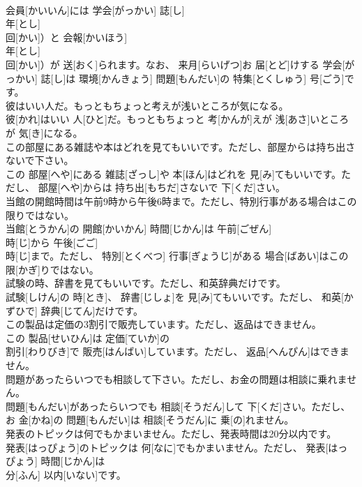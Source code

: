 \documentclass[8pt]{extreport}
\begin{document}
\begin{CJK}{UTF8}{min}
\\	会員[かいいん]には 学会[がっかい] 誌[し]
\\	年[とし] 
\\	回[かい]）と 会報[かいほう]
\\	年[とし] 
\\	回[かい]）が 送[おく]られます。なお、 来月[らいげつ]お 届[とど]けする 学会[がっかい] 誌[し]は 環境[かんきょう] 問題[もんだい]の 特集[とくしゅう] 号[ごう]です。
\\	彼はいい人だ。もっともちょっと考えが浅いところが気になる。	
\\	彼[かれ]はいい 人[ひと]だ。もっともちょっと 考[かんが]えが 浅[あさ]いところが 気[き]になる。
\\	この部屋にある雑誌や本はどれを見てもいいです。ただし、部屋からは持ち出さないで下さい。	
\\	この 部屋[へや]にある 雑誌[ざっし]や 本[ほん]はどれを 見[み]てもいいです。ただし、 部屋[へや]からは 持ち出[もちだ]さないで 下[くだ]さい。
\\	当館の開館時間は午前9時から午後6時まで。ただし、特別行事がある場合はこの限りではない。	
\\	当館[とうかん]の 開館[かいかん] 時間[じかん]は 午前[ごぜん] 
\\	時[じ]から 午後[ごご] 
\\	時[じ]まで。ただし、 特別[とくべつ] 行事[ぎょうじ]がある 場合[ばあい]はこの 限[かぎ]りではない。
\\	試験の時、辞書を見てもいいです。ただし、和英辞典だけです。	
\\	試験[しけん]の 時[とき]、 辞書[じしょ]を 見[み]てもいいです。ただし、 和英[かずひで] 辞典[じてん]だけです。
\\	この製品は定価の3割引で販売しています。ただし、返品はできません。	
\\	この 製品[せいひん]は 定価[ていか]の 
\\	割引[わりびき]で 販売[はんばい]しています。ただし、 返品[へんぴん]はできません。
\\	問題があったらいつでも相談して下さい。ただし、お金の問題は相談に乗れません。	
\\	問題[もんだい]があったらいつでも 相談[そうだん]して 下[くだ]さい。ただし、お 金[かね]の 問題[もんだい]は 相談[そうだん]に 乗[の]れません。
\\	発表のトピックは何でもかまいません。ただし、発表時間は20分以内です。	
\\	発表[はっぴょう]のトピックは 何[なに]でもかまいません。ただし、 発表[はっぴょう] 時間[じかん]は 
\\	分[ふん] 以内[いない]です。

\end{CJK}
\end{document}
